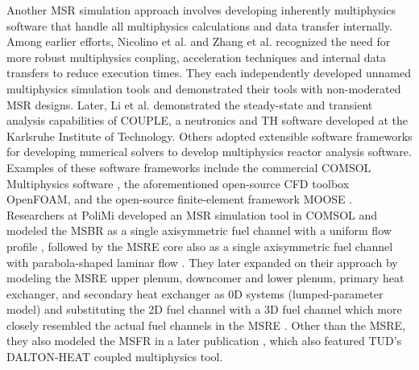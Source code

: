Another \gls{MSR} simulation approach involves developing inherently multiphysics software that
handle all multiphysics calculations and data transfer internally. Among earlier efforts, Nicolino
et al. \cite{nicolino_coupled_2008} and Zhang et al. \cite{zhang_development_2009} recognized the
need for more robust multiphysics coupling, acceleration techniques and internal data transfers
to reduce execution times. They each independently developed unnamed multiphysics simulation tools
and demonstrated their tools with non-moderated \gls{MSR}
designs. Later, Li et al. \cite{li_transient_2015} demonstrated the
steady-state and transient analysis capabilities of COUPLE, a neutronics and
\gls{TH} software developed at the Karlsruhe Institute of Technology.
Others adopted extensible software frameworks for developing numerical solvers
to develop multiphysics reactor analysis software. Examples of these software
frameworks include the commercial COMSOL
Multiphysics\textsuperscript{\textregistered} software
\cite{comsol_ab_comsol_nodate}, the aforementioned open-source CFD toolbox
OpenFOAM, and the open-source finite-element
framework \gls{MOOSE} \cite{gaston_physics-based_2015}. Researchers at
\gls{PoliMi} developed an \gls{MSR} simulation tool in COMSOL and
modeled the \gls{MSBR} as a single axisymmetric fuel channel with a uniform
flow profile \cite{cammi_multi-physics_2011}, followed by the \gls{MSRE} core
also as a single axisymmetric fuel channel with parabola-shaped laminar flow
\cite{cammi_dimensional_2012}. They later expanded on their approach by
modeling the \gls{MSRE} upper plenum, downcomer and lower plenum, primary heat
exchanger, and secondary heat exchanger as 0D systems (lumped-parameter model)
and substituting the 2D fuel channel with a 3D fuel channel which more closely
resembled the actual fuel channels in the \gls{MSRE}
\cite{zanetti_geometric_2015}. Other than the \gls{MSRE}, they also modeled the
\gls{MSFR} in a later publication \cite{fiorina_modelling_2014}, which also featured \gls{TUD}'s
DALTON-HEAT coupled multiphysics tool.

